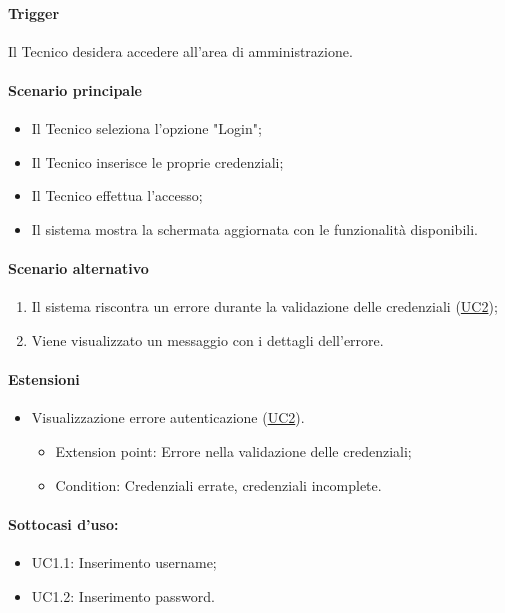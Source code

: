 \paragraph*{Trigger}
Il Tecnico desidera accedere all'area di amministrazione.

\paragraph*{Scenario principale}
\begin{itemize}
  \item Il Tecnico seleziona l'opzione "Login";
  \item Il Tecnico inserisce le proprie credenziali;
  \item Il Tecnico effettua l'accesso;
  \item Il sistema mostra la schermata aggiornata con le funzionalità disponibili.
\end{itemize}

\paragraph*{Scenario alternativo}
\begin{enumerate}
  \item Il sistema riscontra un errore durante la validazione delle credenziali (\hyperref[UC2]{UC2});
  \item Viene visualizzato un messaggio con i dettagli dell'errore.
\end{enumerate}

\paragraph*{Estensioni}
\begin{itemize}
  \item Visualizzazione errore autenticazione (\hyperref[UC2]{UC2}).
  \begin{itemize}
    \item Extension point: Errore nella validazione delle credenziali;
    \item Condition: Credenziali errate, credenziali incomplete.
  \end{itemize}
\end{itemize}

\paragraph*{Sottocasi d'uso:}
\begin{itemize}
  \item UC1.1: Inserimento username;
  \item UC1.2: Inserimento password.
\end{itemize}

